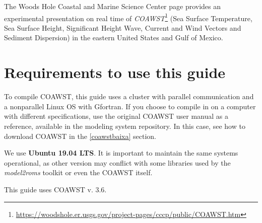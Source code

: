 \noindent The Woods Hole Coastal and Marine Science Center page provides an experimental presentation on real time of 
\textcolor{bleu_cite}{\textit{COAWST}\footnote{\textcolor{bleu_cite}{\href{https://woodshole.er.usgs.gov/project-pages/cccp/public/COAWST.htm}{https://woodshole.er.usgs.gov/project-pages/cccp/public/COAWST.htm}}}}
(Sea Surface Temperature, Sea Surface Height, Significant Height Wave, Current and Wind Vectors and Sediment Dispersion) in the eastern United States and Gulf of Mexico.
\bigskip

\section{Requirements to use this guide}
\bigskip

\noindent To compile COAWST, this guide uses a cluster with parallel communication and a nonparallel Linux OS with Gfortran. If you choose to compile in
on a computer with different specifications, use the original COAWST user manual as a reference, available in the modeling system repository. In this case,
see how to download COAWST in the \textcolor{bleu_cite}{\ref{coawstbaixa}} section.
\bigskip

\noindent We use \textbf{Ubuntu 19.04 LTS}. It is important to maintain the same systems operational, as other version may conflict with some libraries used by the \textit{model2roms} toolkit or 
even the COAWST itself.
\bigskip

\begin{tcolorbox}[enhanced,
    grow to left by=0cm,%
    grow to right by=0cm,%
    enlarge top by=0cm,%
    enlarge bottom by=0cm,%
    tcbox raise base,
    boxrule=1.0pt,
    left=18mm,
    colframe=red!50!black,coltext=red!25!black,colback=red!10!white,
    overlay={\begin{tcbclipinterior}\fill[red!75!blue!50!white] (frame.south west)
      rectangle node[text=white,font=\sffamily\bfseries\footnotesize,rotate=0] {WARNING} ([xshift=18mm]frame.north west);\end{tcbclipinterior}}]
      This guide uses COAWST v. 3.6.
  \end{tcolorbox}
  \bigskip